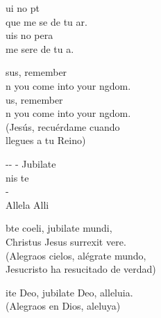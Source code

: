 \documentclass[12pt]{article}
\begin{document}
\begin{multicols*}{2}
\begin{cancion}%
	ui no pt\\
	que me se de tu ar.\\
	uis no pera\\
	 me sere de tu a.\\
\end{cancion}%

\begin{cancion}%
	sus, remember \\
	n you come into your ngdom.\\
	us, remember \\
	n you come into your ngdom.\\
(Jesús, recuérdame cuando \\
 llegues a tu Reino)\\
\end{cancion}%

\begin{cancion}%
	-- -  Jubilate \\
	nis te\\
	  - \\
	Allela Alli\\
\end{cancion}%

\begin{cancion}%
	bte coeli, jubilate mundi,\\
Christus Jesus surrexit vere.\\
(Alegraos cielos, alégrate mundo,\\
 Jesucristo ha resucitado de verdad)\\
\end{cancion}%

\begin{cancion}%
	ite Deo, jubilate Deo, alleluia.\\
(Alegraos en Dios, aleluya)\\
\end{cancion}%


\end{multicols*}
\end{document}

